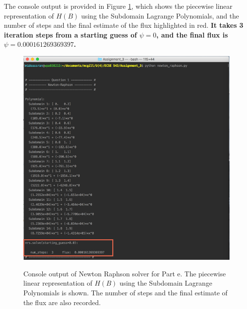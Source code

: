 \documentclass[11pt]{article}
\begin{document}
The console output is provided in Figure \ref{fig:NR_Q1}, which shows the piecewise linear representation of $H(B)$ using the Subdomain Lagrange Polynomials, and the number of steps and the final estimate of the flux highlighted in red. \textbf{It takes 3 iteration steps from a starting guess of $\psi=0$, and the final flux is $\psi=0.000161269369397$.}
\begin{figure}[!hbp]
	\begin{center}
		\begin{minipage}{ \textwidth}
			\includegraphics[width= \textwidth]{NR_Q1}\\
			\caption{\label{fig:NR_Q1}Console output of Newton Raphson solver for Part e. The piecewise linear representation of $H(B)$ using the Subdomain Lagrange Polynomials is shown. The number of steps and the final estimate of the flux are also recorded.}
		\end{minipage}
	\end{center}
\end{figure}

\FloatBarrier
\end{document}
